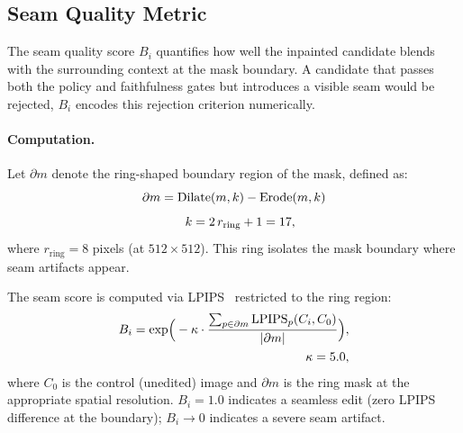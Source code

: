 \subsection{Seam Quality Metric}
\label{app:tspo_seam}

The seam quality score $B_i$ quantifies how well the inpainted candidate
blends with the surrounding context at the mask boundary.
A candidate that passes both the policy and faithfulness gates but introduces
a visible seam would be rejected, $B_i$ encodes this
rejection criterion numerically.

\paragraph{Computation.}
Let $\partial m$ denote the ring-shaped boundary region of the mask,
defined as:
\begin{equation}
  \partial m = \mathrm{Dilate}(m, k) - \mathrm{Erode}(m, k) \notag
\end{equation}
\begin{equation}
  \quad k = 2\,r_\text{ring} + 1 = 17, \notag
  \label{eq:ring_mask}
\end{equation}
where $r_\text{ring} = 8$ pixels (at $512 \times 512$).
This ring isolates the mask boundary where seam artifacts appear.

The seam score is computed via LPIPS~\cite{Zhang_2018_CVPR} restricted to
the ring region:
\begin{equation}
\begin{aligned}
  B_i = \exp\!\Big(-\kappa \cdot \frac{\sum_{p \in \partial m}
    \mathrm{LPIPS}_p(C_i, C_0)}
    {|\partial m|}\Big), \\
  \quad \kappa = 5.0, \notag
  \label{eq:seam_score}
\end{aligned}
\end{equation}
where $C_0$ is the control (unedited) image and $\partial m$ is the ring
mask at the appropriate spatial resolution.
$B_i = 1.0$ indicates a seamless edit (zero LPIPS difference at the
boundary); $B_i \to 0$ indicates a severe seam artifact.


